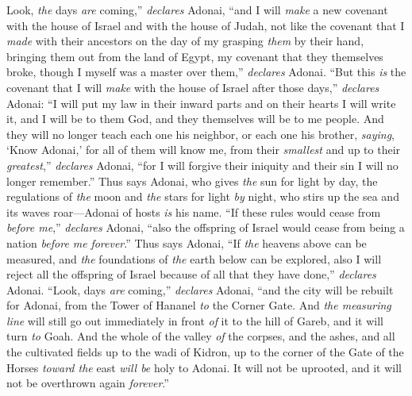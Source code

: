 \begin{biblechapter}
\verse Look, \textit{the} days \textit{are} coming,” \textit{declares} Adonai, “and I will \textit{make} a new covenant with the house of Israel and with the house of Judah,
\verse not like the covenant that I \textit{made} with their ancestors on the day of my grasping \textit{them} by their hand, bringing them out from the land of Egypt, my covenant that they themselves broke, though I myself was a master over them,” \textit{declares} Adonai.
\verse “But this \textit{is} the covenant that I will \textit{make} with the house of Israel after those days,” \textit{declares} Adonai: “I will put my law in their inward parts and on their hearts I will write it, and I will be to them God, and they themselves will be to me people.
\verse And they will no longer teach each one his neighbor, or each one his brother, \textit{saying}, ‘Know Adonai,’ for all of them will know me, from their \textit{smallest} and up to their \textit{greatest},” \textit{declares} Adonai, “for I will forgive their iniquity and their sin I will no longer remember.”
\verse Thus says Adonai, who gives \textit{the} sun for light by day, the regulations of \textit{the} moon and \textit{the} stars for light \textit{by} night, who stirs up the sea and its waves roar—Adonai of hosts \textit{is} his name.
\verse “If these rules would cease from \textit{before me},” \textit{declares} Adonai, “also the offspring of Israel would cease from being a nation \textit{before me} \textit{forever}.”
\verse Thus says Adonai, “If \textit{the} heavens above can be measured, and \textit{the} foundations of \textit{the} earth below can be explored, also I will reject all the offspring of Israel because of all that they have done,” \textit{declares} Adonai.
\verse “Look, days \textit{are} coming,” \textit{declares} Adonai, “and the city will be rebuilt for Adonai, from the Tower of Hananel \textit{to} the Corner Gate.
\verse And \textit{the measuring line} will still go out immediately in front \textit{of} it to the hill of Gareb, and it will turn \textit{to} Goah.
\verse And the whole of the valley \textit{of} the corpses, and the ashes, and all the cultivated fields up to the wadi of Kidron, up to the corner of the Gate of the Horses \textit{toward the} east \textit{will be} holy to Adonai. It will not be uprooted, and it will not be overthrown again \textit{forever}.”
\end{biblechapter}

